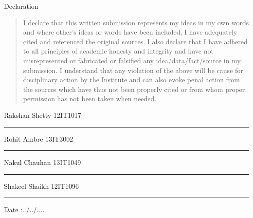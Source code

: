 
\newpage
\begin{center}
\huge Declaration
\end{center}

\vspace{0.5in}
\begin{quote}
I declare that this written submission represents my ideas in my own words and where other’s ideas or words have been included, I have adequately cited and referenced the original sources. I also declare that I have adhered to all principles of academic honesty and integrity and have not misrepresented or fabricated or falsified any idea/data/fact/source in my submission. I understand that any violation of the above will be cause for disciplinary action by the Institute and can also evoke penal action from the sources which have thus not been properly cited or from whom proper permission has not been taken when needed.
\end{quote}
\vspace{1.5in}

\hspace{6.5cm}Rakshan Shetty \hspace{0.2cm} 12IT1017 \hspace{0.2cm} \rule{2cm}{0.5pt}
\vspace{0.1in}

\hspace{6.5cm}Rohit Ambre \hspace{0.6cm} 13IT3002 \hspace{0.2cm} \rule{2cm}{0.5pt}
\vspace{0.1in}

\hspace{6.5cm}Nakul Chauhan \hspace{0.2cm} 13IT1049 \hspace{0.2cm} \rule{2cm}{0.5pt}

\hspace{6.5cm}Shakeel Shaikh \hspace{0.2cm} 12IT1096 \hspace{0.2cm} \rule{2cm}{0.5pt}

\vspace{0.2in}
\begin{flushleft}
  Date :../../....
\end{flushleft}
